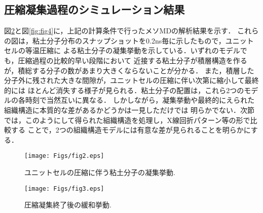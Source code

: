 \subsection{圧縮凝集過程のシミュレーション結果}
図\ref{fig:fig3}と図\ref{fig:fig4}に，上記の計算条件で行ったメソMDの解析結果を示す．
これらの図は，粘土分子分布のスナップショットを0.2ns毎に示したもので，ユニットセルの等温圧縮に
よる粘土分子の凝集挙動を示している．いずれのモデルでも，圧縮過程の比較的早い段階において
近接する粘土分子が積層構造を作るが，積総する分子の数があまり大きくならないことが分かる．
また，積層した分子外に残された大きな間隙が，ユニットセルの圧縮に伴い次第に縮小して最終的には
ほとんど消失する様子が見られる．粘土分子の配置は，これら2つのモデルの各時刻で当然互いに異なる．
しかしながら，凝集挙動や最終的にえられた組織構造に本質的な差があるかどうかは一見しただけでは
明らかでない．次節では，このようにして得られた組織構造を処理し，X線回折パターン等の形で比較する
ことで，2つの組織構造モデルには有意な差が見られることを明らかにする．
\begin{figure}[h]
	\begin{center}
	\texttt{[image: Figs/fig2.eps]} 
	\end{center}
	\caption{
		ユニットセルの圧縮に伴う粘土分子の凝集挙動.
	} 
	\label{fig:fig2}
\end{figure}
\begin{figure}[h]
	\begin{center}
	\texttt{[image: Figs/fig3.eps]} 
	\end{center}
	\caption{
		圧縮凝集終了後の緩和挙動.
	} 
	\label{fig:fig3}
\end{figure}
